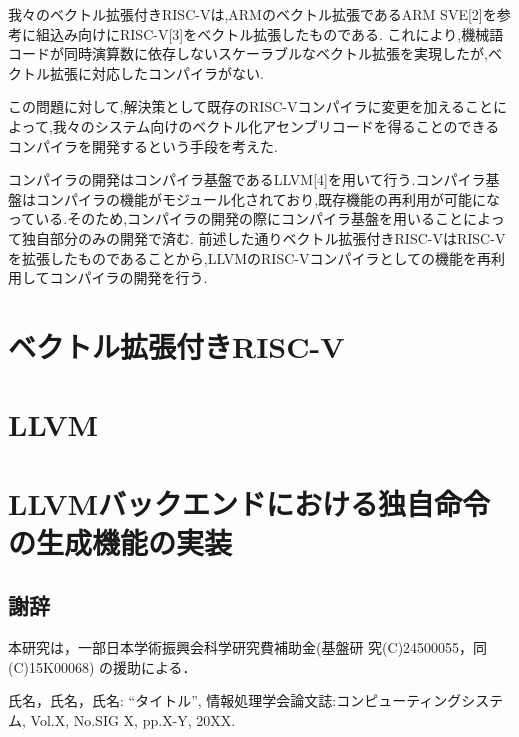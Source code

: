 \documentclass[a4paper,9pt, twocolumn]{jarticle}
\renewcommand{\baselinestretch}{0.87}   %
\begin{document}
我々のベクトル拡張付きRISC-Vは,ARMのベクトル拡張であるARM SVE[2]を参考に組込み向けにRISC-V[3]をベクトル拡張したものである.
これにより,機械語コードが同時演算数に依存しないスケーラブルなベクトル拡張を実現したが,ベクトル拡張に対応したコンパイラがない.

この問題に対して,解決策として既存のRISC-Vコンパイラに変更を加えることによって,我々のシステム向けのベクトル化アセンブリコードを得ることのできるコンパイラを開発するという手段を考えた.

コンパイラの開発はコンパイラ基盤であるLLVM[4]を用いて行う.コンパイラ基盤はコンパイラの機能がモジュール化されており,既存機能の再利用が可能になっている.そのため,コンパイラの開発の際にコンパイラ基盤を用いることによって独自部分のみの開発で済む.
前述した通りベクトル拡張付きRISC-VはRISC-Vを拡張したものであることから,LLVMのRISC-Vコンパイラとしての機能を再利用してコンパイラの開発を行う.


\section{ベクトル拡張付きRISC-V}


\section{LLVM}

\section{LLVMバックエンドにおける独自命令の生成機能の実装}

\renewcommand{\baselinestretch}{0.83}\selectfont
\subsection*{\small 謝辞}
\vspace{-0.5mm}
{\small 本研究は，一部日本学術振興会科学研究費補助金(基盤研
究(C)24500055，同(C)15K00068) の援助による．}


%
%
\begin{thebibliography}{9}
\itemsep -1.7pt

{\small 氏名，氏名，氏名:      %
\newblock ``タイトル'',
\newblock 情報処理学会論文誌:コンピューティングシステム,
\newblock Vol.X,
\newblock No.SIG X,
\newblock pp.X-Y,
\newblock 20XX.}

\end{thebibliography}
\end{document}
